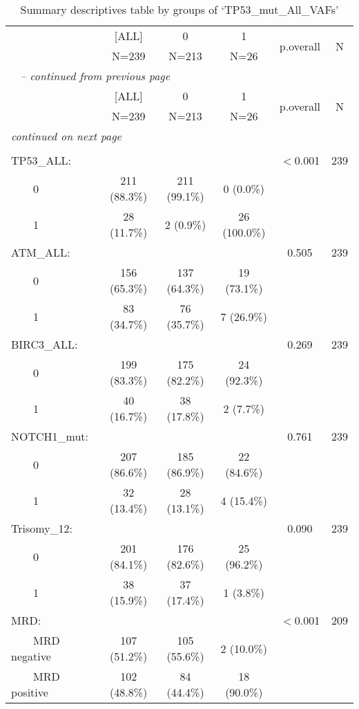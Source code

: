     
    \begin{longtable}{lccccc}\caption{Summary descriptives table by groups of `TP53\_mut\_All\_VAFs'}\\
    \hline  
     &    [ALL]    &      0      &      1      & \multirow{2}{*}{p.overall} & \multirow{2}{*}{ N }\\ 
 &    N=239    &    N=213    &    N=26     &           &     \\ 
  
    \hline
    \hline     
    \endfirsthead 
    \multicolumn{6}{l}{\tablename\ \thetable{} \textit{-- continued from previous page}}\\ 
    \hline
     &    [ALL]    &      0      &      1      & \multirow{2}{*}{p.overall} & \multirow{2}{*}{ N }\\ 
 &    N=239    &    N=213    &    N=26     &           &     \\ 

    \hline
    \hline  
    \endhead   
    \hline
    \multicolumn{6}{l}{\textit{continued on next page}} \\ 
    \endfoot   
    \multicolumn{6}{l}{}  \\ 
    \endlastfoot 
    TP53\_ALL: &             &             &             &  $<$0.001   & 239\\ 
$\qquad$0 & 211 (88.3\%) & 211 (99.1\%) &  0 (0.0\%)   &           &    \\ 
$\qquad$1 & 28 (11.7\%)  &  2 (0.9\%)   & 26 (100.0\%) &           &    \\ 
ATM\_ALL: &             &             &             &   0.505   & 239\\ 
$\qquad$0 & 156 (65.3\%) & 137 (64.3\%) & 19 (73.1\%)  &           &    \\ 
$\qquad$1 & 83 (34.7\%)  & 76 (35.7\%)  &  7 (26.9\%)  &           &    \\ 
BIRC3\_ALL: &             &             &             &   0.269   & 239\\ 
$\qquad$0 & 199 (83.3\%) & 175 (82.2\%) & 24 (92.3\%)  &           &    \\ 
$\qquad$1 & 40 (16.7\%)  & 38 (17.8\%)  &  2 (7.7\%)   &           &    \\ 
NOTCH1\_mut: &             &             &             &   0.761   & 239\\ 
$\qquad$0 & 207 (86.6\%) & 185 (86.9\%) & 22 (84.6\%)  &           &    \\ 
$\qquad$1 & 32 (13.4\%)  & 28 (13.1\%)  &  4 (15.4\%)  &           &    \\ 
Trisomy\_12: &             &             &             &   0.090   & 239\\ 
$\qquad$0 & 201 (84.1\%) & 176 (82.6\%) & 25 (96.2\%)  &           &    \\ 
$\qquad$1 & 38 (15.9\%)  & 37 (17.4\%)  &  1 (3.8\%)   &           &    \\ 
MRD: &             &             &             &  $<$0.001   & 209\\ 
$\qquad$MRD negative & 107 (51.2\%) & 105 (55.6\%) &  2 (10.0\%)  &           &    \\ 
$\qquad$MRD positive & 102 (48.8\%) & 84 (44.4\%)  & 18 (90.0\%)  &           &     \\ 
 
    \hline
    \end{longtable}
